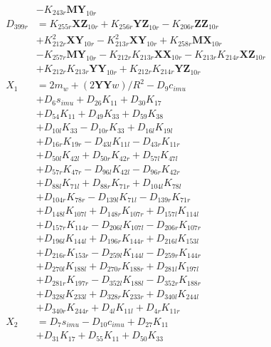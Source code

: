 \begin{multicols}{2}
\begin{align}
&- K_{243r}\mathbf{MY}_{10r} \nonumber \\
D_{399r} &= K_{255r}\mathbf{XZ}_{10r} + K_{256r}\mathbf{YZ}_{10r} - K_{206r}\mathbf{ZZ}_{10r}  \nonumber \\
&+ K_{212r}^2\mathbf{XY}_{10r} - K_{213r}^2\mathbf{XY}_{10r} + K_{258r}\mathbf{MX}_{10r}  \nonumber \\
&- K_{257r}\mathbf{MY}_{10r} - K_{212r}K_{213r}\mathbf{XX}_{10r} - K_{213r}K_{214r}\mathbf{XZ}_{10r}  \nonumber \\
&+ K_{212r}K_{213r}\mathbf{YY}_{10r} + K_{212r}K_{214r}\mathbf{YZ}_{10r} \nonumber \\
X_{1} &= 2m_w + (2\mathbf{YY}w)/R^2 - D_{9}c_{imu}  \nonumber \\
&+ D_{6}s_{imu} + D_{26}K_{11} + D_{30}K_{17}  \nonumber \\
&+ D_{54}K_{11} + D_{49}K_{33} + D_{59}K_{38}  \nonumber \\
&+ D_{10l}K_{33} - D_{10r}K_{33} + D_{16l}K_{19l}  \nonumber \\
&+ D_{16r}K_{19r} - D_{43l}K_{11l} - D_{43r}K_{11r}  \nonumber \\
&+ D_{50l}K_{42l} + D_{50r}K_{42r} + D_{57l}K_{47l}  \nonumber \\
&+ D_{57r}K_{47r} - D_{96l}K_{42l} - D_{96r}K_{42r}  \nonumber \\
&+ D_{88l}K_{71l} + D_{88r}K_{71r} + D_{104l}K_{78l}  \nonumber \\
&+ D_{104r}K_{78r} - D_{139l}K_{71l} - D_{139r}K_{71r}  \nonumber \\
&+ D_{148l}K_{107l} + D_{148r}K_{107r} + D_{157l}K_{114l}  \nonumber \\
&+ D_{157r}K_{114r} - D_{206l}K_{107l} - D_{206r}K_{107r}  \nonumber \\
&+ D_{196l}K_{144l} + D_{196r}K_{144r} + D_{216l}K_{153l}  \nonumber \\
&+ D_{216r}K_{153r} - D_{259l}K_{144l} - D_{259r}K_{144r}  \nonumber \\
&+ D_{270l}K_{188l} + D_{270r}K_{188r} + D_{281l}K_{197l}  \nonumber \\
&+ D_{281r}K_{197r} - D_{352l}K_{188l} - D_{352r}K_{188r}  \nonumber \\
&+ D_{328l}K_{233l} + D_{328r}K_{233r} + D_{340l}K_{244l}  \nonumber \\
&+ D_{340r}K_{244r} + D_{4l}K_{11l} + D_{4r}K_{11r} \nonumber \\
X_{2} &= D_{7}s_{imu} - D_{10}c_{imu} + D_{27}K_{11}  \nonumber \\
&+ D_{31}K_{17} + D_{55}K_{11} + D_{50}K_{33}  \nonumber \\

\end{align}
\end{multicols}
